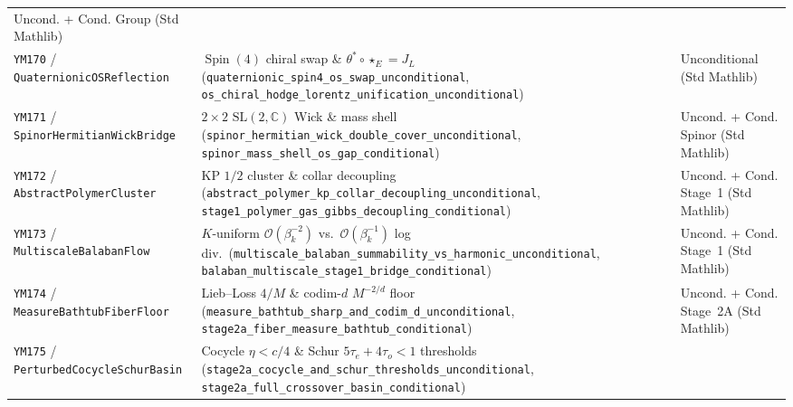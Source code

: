 \documentclass[11pt,a4paper]{article}
\begin{document}
\begin{table}[ht]
\begin{tabular}{@{}p{4.3cm}p{6.6cm}p{3.4cm}@{}}
Uncond. + Cond. Group (Std Mathlib) \\
\texttt{YM170} / \texttt{QuaternionicOS\allowbreak Reflection} &
$\operatorname{Spin}(4)$ chiral swap \& $\theta^* \circ \star_E = J_L$ (\texttt{quaternionic\_\allowbreak spin4\_\allowbreak os\_\allowbreak swap\_\allowbreak unconditional}, \texttt{os\_\allowbreak chiral\_\allowbreak hodge\_\allowbreak lorentz\_\allowbreak unification\_\allowbreak unconditional}) &
Unconditional (Std Mathlib) \\
\texttt{YM171} / \texttt{SpinorHermitian\allowbreak WickBridge} &
$2\times 2$ $\mathrm{SL}(2,\mathbb{C})$ Wick \& mass shell (\texttt{spinor\_\allowbreak hermitian\_\allowbreak wick\_\allowbreak double\_\allowbreak cover\_\allowbreak unconditional}, \texttt{spinor\_\allowbreak mass\_\allowbreak shell\_\allowbreak os\_\allowbreak gap\_\allowbreak conditional}) &
Uncond. + Cond. Spinor (Std Mathlib) \\
\texttt{YM172} / \texttt{AbstractPolymer\allowbreak Cluster} &
KP $1/2$ cluster \& collar decoupling (\texttt{abstract\_\allowbreak polymer\_\allowbreak kp\_\allowbreak collar\_\allowbreak decoupling\_\allowbreak unconditional}, \texttt{stage1\_\allowbreak polymer\_\allowbreak gas\_\allowbreak gibbs\_\allowbreak decoupling\_\allowbreak conditional}) &
Uncond. + Cond. Stage~1 (Std Mathlib) \\
\texttt{YM173} / \texttt{MultiscaleBalaban\allowbreak Flow} &
$K$-uniform $\mathcal{O}(\beta_k^{-2})$ vs.\ $\mathcal{O}(\beta_k^{-1})$ log div.\ (\texttt{multiscale\_\allowbreak balaban\_\allowbreak summability\_\allowbreak vs\_\allowbreak harmonic\_\allowbreak unconditional}, \texttt{balaban\_\allowbreak multiscale\_\allowbreak stage1\_\allowbreak bridge\_\allowbreak conditional}) &
Uncond. + Cond. Stage~1 (Std Mathlib) \\
\texttt{YM174} / \texttt{MeasureBathtub\allowbreak FiberFloor} &
Lieb--Loss $4/M$ \& codim-$d$ $M^{-2/d}$ floor (\texttt{measure\_\allowbreak bathtub\_\allowbreak sharp\_\allowbreak and\_\allowbreak codim\_\allowbreak d\_\allowbreak unconditional}, \texttt{stage2a\_\allowbreak fiber\_\allowbreak measure\_\allowbreak bathtub\_\allowbreak conditional}) &
Uncond. + Cond. Stage~2A (Std Mathlib) \\
\texttt{YM175} / \texttt{PerturbedCocycle\allowbreak SchurBasin} &
Cocycle $\eta<c/4$ \& Schur $5\tau_e+4\tau_o<1$ thresholds (\texttt{stage2a\_\allowbreak cocycle\_\allowbreak and\_\allowbreak schur\_\allowbreak thresholds\_\allowbreak unconditional}, \texttt{stage2a\_\allowbreak full\_\allowbreak crossover\_\allowbreak basin\_\allowbreak conditional}) &

\end{tabular}
\end{table}
\end{document}

